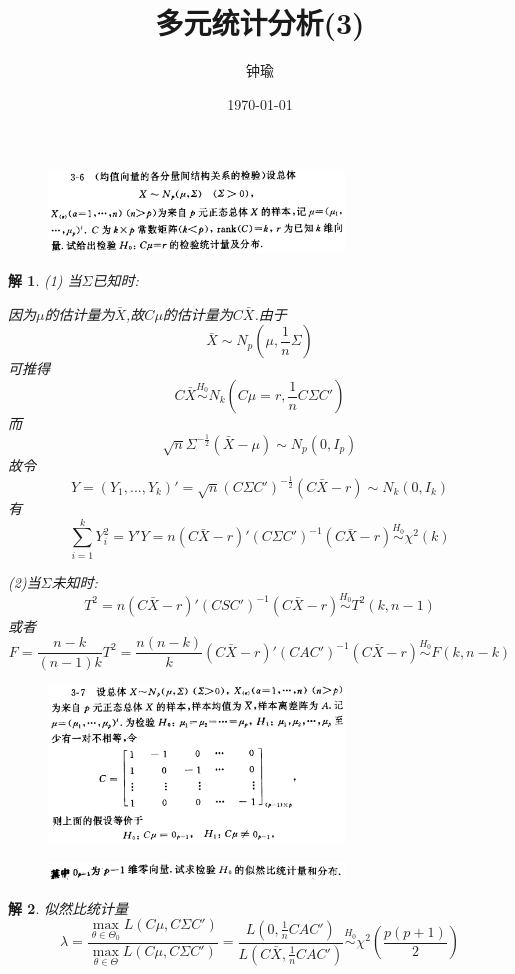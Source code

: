 \documentclass[11pt,a4paper]{ctexart}
\title{多元统计分析(3)}
\author{钟瑜 \quad 222018314210044}
\date{\today}
\newtheorem*{solution}{解}
\begin{document}
	\maketitle
	\pagestyle{plain}%
	
	
\begin{figure}[H]
	\includegraphics[width=0.7\textwidth]{1.png}
\end{figure}
\begin{solution}
(1) 当$ \Sigma $已知时:

因为$ \mu $的估计量为$ \bar{X} $,故$ C\mu $的估计量为$ C\bar{X} $.由于$$ \bar{X} \sim N_p(\mu,\frac{1}{n}\Sigma)$$可推得$$  C\bar{X} \stackrel{H_0}{\sim} N_k(C\mu=r,\frac{1}{n}C\Sigma C') $$而
$$\sqrt{n}\Sigma ^{-\frac{1}{2}}(\bar{X}-\mu)\sim N_p (0,I_p) $$
故令$$Y=(Y_1,...,Y_k)'=\sqrt{n}(C\Sigma C')^{-\frac{1}{2}}(C\bar{X}-r)\sim N_k (0,I_k) $$
有$$ \sum_{i=1}^{k}Y_i^2=Y'Y=n(C\bar{X}-r)'(C\Sigma C')^{-1}(C\bar{X}-r) \stackrel{H_0}{\sim}\chi^2(k) $$

(2)当$ \Sigma $未知时:
$$ T^2=n(C\bar{X}-r)'(CSC')^{-1}(C\bar{X}-r)\stackrel{H_0}{\sim}T^2(k,n-1) $$
或者
$$F= \frac{n-k}{(n-1)k}T^2=\frac{n(n-k)}{k}(C\bar{X}-r)'(CAC')^{-1}(C\bar{X}-r)\stackrel{H_0}{\sim}F(k,n-k) $$
\end{solution}
\begin{figure}[H]
	\includegraphics[width=0.7\textwidth]{2.png}
\end{figure}
\begin{figure}[H]
	\includegraphics[width=0.7\textwidth]{3.png}
\end{figure}
\begin{solution}
似然比统计量
$$ \lambda=
\frac{{\max}_{\theta\in\Theta_0} L(C\mu,C\Sigma C')}{{\max}_{\theta\in\Theta} L(C\mu,C\Sigma C')}
=\frac{L(0,\frac{1}{n}CAC')}{L(C\bar{X},\frac{1}{n}CAC')}\stackrel{H_0}{\sim}\chi^2(\frac{p(p+1)}{2})  $$
\end{solution}
\end{document}
